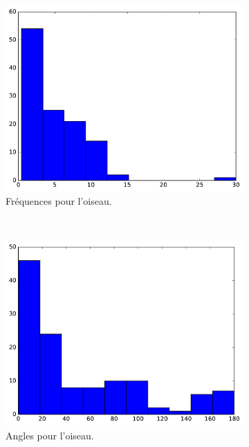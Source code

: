 \begin{figure}
		~
		\begin{subfigure}[t]{\subImgWaStats}
			\centering
			\includegraphics[width=\textwidth]{figures/ch3/oiseau_frequency}
			\caption{Fréquences pour l'oiseau.}
			\label{fig:oiseau_frequency}
		\end{subfigure}
		~
		\begin{subfigure}[t]{\subImgWaStats}
			\centering
			\includegraphics[width=\textwidth]{figures/ch3/oiseau_angle}
			\caption{Angles pour l'oiseau.}
			\label{fig:oiseau_angle}
		\end{subfigure}
		\caption[Histogrammes, navette spatiale et oiseau]{}
		\label{fig:histSpaceOiseau}
	\end{figure}
	
